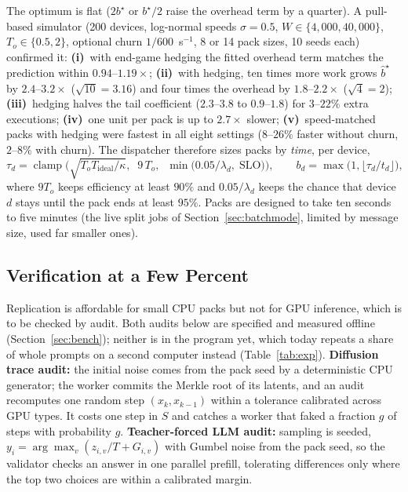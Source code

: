 \documentclass[11pt,a4paper]{article}
\theoremstyle{definition}
\theoremstyle{plain}
\begin{document}
\noindent The optimum is flat ($2b^\star$ or $b^\star/2$ raise the overhead term by a quarter). A pull-based
simulator (200 devices, log-normal speeds $\sigma=0.5$, $W\in\{4{,}000,40{,}000\}$, $T_o\in\{0.5,2\}$, optional
churn $1/600$~s$^{-1}$, 8 or 14 pack sizes, 10 seeds each) confirmed it: \textbf{(i)}~with end-game hedging
\citep{dean2004mapreduce} the fitted overhead term matches the prediction within
$0.94$--$1.19\times$; \textbf{(ii)}~with hedging, ten times more work grows $\hat b^\star$ by $2.4$--$3.2\times$ ($\sqrt{10}=3.16$)
and four times the overhead by $1.8$--$2.2\times$ ($\sqrt4=2$); \textbf{(iii)}~hedging halves the tail coefficient ($2.3$--$3.8$ to $0.9$--$1.8$) for $3$--$22\%$ extra
executions; \textbf{(iv)}~one unit per pack is up to $2.7\times$ slower; \textbf{(v)}~speed-matched packs with
hedging were fastest in all eight settings ($8$--$26\%$ faster without churn, $2$--$8\%$ with churn). The dispatcher
therefore sizes packs by \emph{time}, per device,
\begin{equation}\label{eq:sizing}
\tau_d=\operatorname{clamp}\!\Big(\sqrt{T_oT_{\text{ideal}}/\kappa},\;\;9\,T_o,\;\;
\min\big(0.05/\lambda_d,\;\text{SLO}\big)\Big),\qquad b_d=\max\big(1,\lfloor \tau_d/t_d\rfloor\big),
\end{equation}
where $9T_o$ keeps efficiency at least $90\%$ and $0.05/\lambda_d$ keeps the chance that device $d$ stays
until the pack ends at least $95\%$. Packs are designed to take ten seconds to five minutes (the live split jobs of Section~\ref{sec:batchmode},
limited by message size, used far smaller ones).

\subsection{Verification at a Few Percent}\label{sec:audits}

Replication is affordable for small CPU packs but not for GPU inference, which is to be checked by audit.
Both audits below are specified and measured offline (Section~\ref{sec:bench}); neither is in the program yet,
which today repeats a share of whole prompts on a second computer instead (Table~\ref{tab:exp}).
\textbf{Diffusion trace audit:} the initial noise comes from the pack seed by a deterministic CPU generator;
the worker commits the Merkle root of its latents, and an audit recomputes one random step $(x_k,x_{k-1})$
within a tolerance calibrated across GPU types. It costs one step in $S$ and catches a worker that faked a
fraction $g$ of steps with probability $g$. \textbf{Teacher-forced LLM audit:} sampling is seeded,
$y_i=\arg\max_v(z_{i,v}/T+G_{i,v})$ with Gumbel noise from the pack seed, so the validator checks an answer in
one parallel prefill, tolerating differences only where the top two choices are within a calibrated margin.
\end{document}
